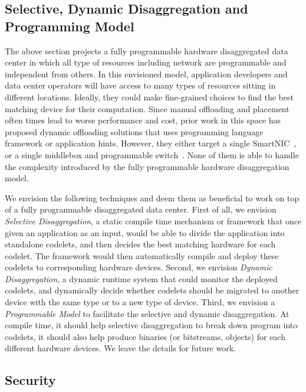 \subsection{Selective, Dynamic Disaggregation and Programming Model}

The above section projects a fully programmable hardware disaggregated data center
in which all type of resources including network are programmable and independent from others.
In this envisioned model, application developers and data center operators
will have access to many types of resources sitting in different locations.
Ideally, they could make fine-grained choices to find the best matching device for their computation.
Since manual offloading and placement often times lead to worse performance and cost,
prior work in this space has proposed dynamic offloading solutions that uses programming language framework or application hints.
However, they either target a single SmartNIC~\cite{floem-osdi18,clara-sosp21,iPipe}, or a single middlebox and programmable switch~\cite{gallium-sigcomm20,chen-pswitch-offload}.
None of them is able to handle the complexity introduced by the fully programmable hardware disaggregation model.

We envision the following techniques and
deem them as beneficial to work on top of a fully programmable disaggregated data center.
%
First of all, we envision \textit{Selective Disaggregation},
a static compile time mechanism or framework that once given an application as an input,
would be able to divide the application into standalone codelets, 
and then decides the best matching hardware for each codelet.
The framework would then automatically compile and deploy these codelets to corresponding hardware devices.
%
Second, we envision \textit{Dynamic Disaggregation},
a dynamic runtime system that could monitor the deployed codelets,
and dynamically decide whether codelets
should be migrated to another device with the same type or to
a new type of device.
%
Third, we envision a \textit{Programmable Model}
to facilitate the selective and dynamic disaggregation.
At compile time, it should help selective disaggregation to break down program into codelets,
it should also help produce binaries (or bitstreams, objects) for each different hardware devices.
We leave the details for future work.

\subsection{Security}

